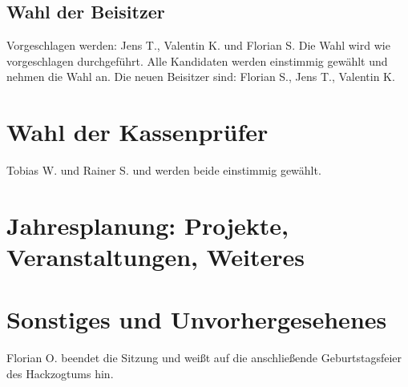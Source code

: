 \subsection{Wahl der Beisitzer}
  Vorgeschlagen werden: Jens T., Valentin K. und Florian S.
  Die Wahl wird wie vorgeschlagen durchgeführt. 
  Alle Kandidaten werden einstimmig gewählt und nehmen die Wahl an. 
  Die neuen Beisitzer sind: Florian S., Jens T., Valentin K.

\section{Wahl der Kassenprüfer}
 Tobias W. und Rainer S. und werden beide einstimmig gewählt. 
 
\section{Jahresplanung:   Projekte,   Veranstaltungen, Weiteres}
 
\section{Sonstiges und Unvorhergesehenes}
 Florian O. beendet die Sitzung und weißt auf die anschließende Geburtstagsfeier des Hackzogtums hin. 
